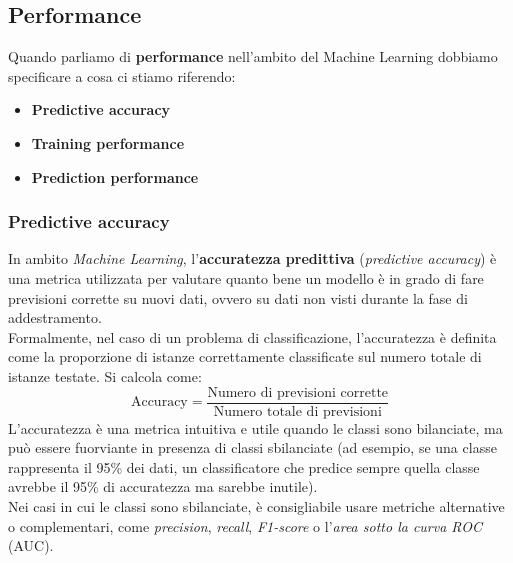 \subsection{Performance}
Quando parliamo di \textbf{performance} nell'ambito del Machine Learning dobbiamo specificare a cosa ci stiamo riferendo:
\begin{itemize}
    \item \textbf{Predictive accuracy}
    \item \textbf{Training performance}
    \item \textbf{Prediction performance}
\end{itemize}

\subsubsection*{Predictive accuracy}
In ambito \textit{Machine Learning}, l'\textbf{accuratezza predittiva} (\textit{predictive accuracy}) è una metrica utilizzata per valutare quanto bene un modello è in grado di fare previsioni corrette su nuovi dati, ovvero su dati non visti durante la fase di addestramento.
\\
Formalmente, nel caso di un problema di classificazione, l'accuratezza è definita come la proporzione di istanze correttamente classificate sul numero totale di istanze testate. Si calcola come:
\[
\text{Accuracy} = \frac{\text{Numero di previsioni corrette}}{\text{Numero totale di previsioni}}
\]
L'accuratezza è una metrica intuitiva e utile quando le classi sono bilanciate, ma può essere fuorviante in presenza di classi sbilanciate (ad esempio, se una classe rappresenta il 95\% dei dati, un classificatore che predice sempre quella classe avrebbe il 95\% di accuratezza ma sarebbe inutile).
\\
Nei casi in cui le classi sono sbilanciate, è consigliabile usare metriche alternative o complementari, come \textit{precision}, \textit{recall}, \textit{F1-score} o l'\textit{area sotto la curva ROC} (AUC).

